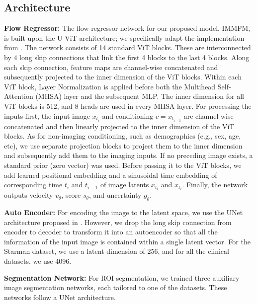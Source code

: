 \documentclass[twoside]{article}
\newcommand{\bc}[1]{\textcolor{black}{#1}}
\begin{document}
\subsection{Architecture}
\label{app:architecture}
\textbf{Flow Regressor:} The flow regressor network for our proposed model, IMMFM, is built upon the U-ViT \citep{yu2022unified} architecture; we specifically adapt the implementation from \citep{davtyan2023efficient}. The network consists of 14 standard ViT\citep{dosovitskiy2021an} blocks. These are interconnected by 4 long skip connections that link the first 4 blocks to the last 4 blocks. Along each skip connection, feature maps are channel-wise concatenated and subsequently projected to the inner dimension of the ViT blocks. Within each ViT block, Layer Normalization is applied before both the Multihead Self-Attention (MHSA) layer and the subsequent MLP. The inner dimension for all ViT blocks is 512, and 8 heads are used in every MHSA layer. For processing the inputs first, the input image $x_{t_i}$ and conditioning $c={x_{t_{i-1}}}$ are channel-wise concatenated and then linearly projected to the inner dimension of the ViT blocks. As for non-imaging conditioning, such as demographics (e.g., sex, age, etc), we use separate projection blocks to project them to the inner dimension and subsequently add them to the imaging inputs. If no preceding image exists, a standard prior (zero vector) was used. Before passing it to the ViT blocks, we add learned positional embedding and a sinusoidal time embedding \citep{vaswani2017attention} of corresponding time  $t_i$ and $t_{i-1}$ of \bc{image latents} $x_{t_i}$ and $x_{t_i}$. Finally, the network outputs velocity $v_\theta$, score $s_\theta$, and uncertainty $g_\theta$.


\textbf{Auto Encoder:} For encoding the image to the latent space, we use the UNet architecture proposed in \citep{dhariwal2021diffusion}. However, we drop the long skip connection from encoder to decoder to transform it into an autoencoder so that all the information of the input image is contained within a single latent vector. For the Starman dataset, we use a latent dimension of 256, and for all the clinical datasets, we use 4096.

\textbf{Segmentation Network: } For ROI segmentation, we trained three auxiliary image segmentation networks, each tailored to one of the datasets. These networks follow a UNet \citep{isensee2021nnu} architecture. 
\end{document}
